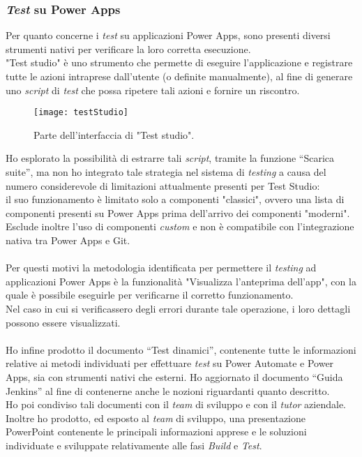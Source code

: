 \subsubsection*{\emph{Test} su Power Apps}
Per quanto concerne i \emph{test} su applicazioni Power Apps, sono presenti diversi strumenti nativi per verificare la loro corretta esecuzione.\\
"Test studio" è uno strumento che permette di eseguire l'applicazione e registrare tutte le azioni intraprese dall'utente (o definite manualmente), al fine di generare uno \emph{script} di \emph{test} che possa ripetere tali azioni e fornire un riscontro.
\begin{figure}[htbp] 
    \centering 
    \texttt{[image: testStudio]} 
    \caption{Parte dell'interfaccia di "Test studio".}
    \label{fig:testStudio}
\end{figure}
\newline \noindent Ho esplorato la possibilità di estrarre tali \emph{script}, tramite la funzione “Scarica suite”, ma non ho integrato tale strategia nel sistema di \emph{testing} a causa del numero considerevole di limitazioni attualmente presenti per Test Studio:\\
il suo funzionamento è limitato solo a componenti "classici", ovvero una lista di componenti presenti su Power Apps prima dell'arrivo dei componenti "moderni".\\
Esclude inoltre l'uso di componenti \emph{custom} e non è compatibile con l'integrazione nativa tra Power Apps e Git.\\\\
Per questi motivi la metodologia identificata per permettere il \emph{testing} ad applicazioni Power Apps è la funzionalità "Visualizza l'anteprima dell'app", con la quale è possibile eseguirle per verificarne il corretto funzionamento.\\
Nel caso in cui si verificassero degli errori durante tale operazione, i loro dettagli possono essere visualizzati.\\\\
Ho infine prodotto il documento “Test dinamici”, contenente tutte le informazioni relative ai metodi individuati per effettuare \emph{test} su Power Automate e Power Apps, sia con strumenti nativi che esterni.
Ho aggiornato il documento “Guida Jenkins” al fine di contenerne anche le nozioni riguardanti quanto descritto.\\
Ho poi condiviso tali documenti con il \emph{team} di sviluppo e con il \emph{\emph{tutor}} aziendale.\\
Inoltre ho prodotto, ed esposto al \emph{team} di sviluppo, una presentazione PowerPoint contenente le principali informazioni apprese e le soluzioni individuate e sviluppate relativamente alle fasi \emph{Build} e \emph{Test}. 


